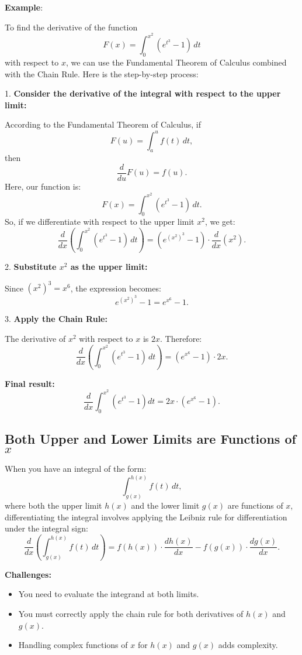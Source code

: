 \documentclass[a4paper,12pt]{book}
\begin{document}



\textbf{Example}:

To find the derivative of the function 
\[
F(x) = \int_0^{x^2}(e^{t^3} - 1) \, dt
\]
with respect to \(x\), we can use the Fundamental Theorem of Calculus combined with the Chain Rule. Here is the step-by-step process:

1. \textbf{Consider the derivative of the integral with respect to the upper limit:}

   According to the Fundamental Theorem of Calculus, if
   \[
   F(u) = \int_a^u f(t) \, dt,
   \]
   then
   \[
   \dfrac{d}{du} F(u) = f(u).
   \]
   Here, our function is:
   \[
   F(x) = \int_0^{x^2} (e^{t^3} - 1) \, dt.
   \]
   So, if we differentiate with respect to the upper limit \(x^2\), we get:
   \[
   \dfrac{d}{dx} \left( \int_0^{x^2} (e^{t^3} - 1) \, dt \right) = (e^{(x^2)^3} - 1) \cdot \dfrac{d}{dx}(x^2).
   \]

2. \textbf{Substitute \(x^2\) as the upper limit:}

   Since \((x^2)^3 = x^6\), the expression becomes:
   \[
   e^{(x^2)^3} - 1 = e^{x^6} - 1.
   \]

3. \textbf{Apply the Chain Rule:}

   The derivative of \(x^2\) with respect to \(x\) is \(2x\). Therefore:
   \[
   \dfrac{d}{dx} \left( \int_0^{x^2} (e^{t^3} - 1) \, dt \right) = (e^{x^6} - 1) \cdot 2x.
   \]

\textbf{Final result:}
\[
\dfrac{d}{dx} \int_0^{x^2}(e^{t^3} - 1)dt = 2x \cdot (e^{x^6} - 1).
\]

\subsection{Both Upper and Lower Limits are Functions of \texorpdfstring{\(x\)}{x}}


   When you have an integral of the form:
   \[
   \int_{g(x)}^{h(x)} f(t) \, dt,
   \]
   where both the upper limit \(h(x)\) and the lower limit \(g(x)\) are functions of \(x\), differentiating the integral involves applying the Leibniz rule for differentiation under the integral sign:
   \[
   \dfrac{d}{dx} \left( \int_{g(x)}^{h(x)} f(t) \, dt \right) = f(h(x)) \cdot \dfrac{dh(x)}{dx} - f(g(x)) \cdot \dfrac{dg(x)}{dx}.
   \]
   
\textbf{Challenges:}
   
\begin{itemize}
\item
You need to evaluate the integrand at both limits.
\item
You must correctly apply the chain rule for both derivatives of \(h(x)\) and \(g(x)\).
\item
Handling complex functions of \(x\) for \(h(x)\) and \(g(x)\) adds complexity.
\end{itemize}
\end{document}
